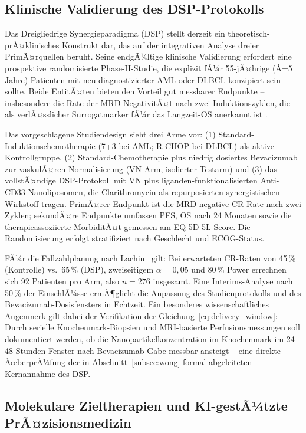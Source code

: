 ﻿\documentclass[12pt,a4paper]{article}
\theoremstyle{definition}
\begin{document}
\subsection{Klinische Validierung des DSP-Protokolls}

Das Dreigliedrige Synergieparadigma (DSP) stellt derzeit ein theoretisch-prÃ¤klinisches
Konstrukt dar, das auf der integrativen Analyse dreier PrimÃ¤rquellen beruht.
Seine endgÃ¼ltige klinische Validierung erfordert eine prospektive randomisierte
Phase-II-Studie, die explizit fÃ¼r 55-jÃ¤hrige (Â±5 Jahre) Patienten mit neu
diagnostizierter AML oder DLBCL konzipiert sein sollte. Beide EntitÃ¤ten bieten
den Vorteil gut messbarer Endpunkte -- insbesondere die Rate der MRD-NegativitÃ¤t
nach zwei Induktionszyklen, die als verlÃ¤sslicher Surrogatmarker fÃ¼r das
Langzeit-OS anerkannt ist \cite{dohner2017}.

Das vorgeschlagene Studiendesign sieht drei Arme vor: (1) Standard-Induktionschemothera\-pie
(7+3 bei AML; R-CHOP bei DLBCL) als aktive Kontrollgruppe, (2) Standard-Chemotherapie
plus niedrig dosiertes Bevacizumab zur vaskulÃ¤ren Normalisierung (VN-Arm, isolierter
Testarm) und (3) das vollstÃ¤ndige DSP-Protokoll mit VN plus liganden-funktionalisierten
Anti-CD33-Nanoliposomen, die Clarithromycin als repurposierten synergistischen Wirkstoff
tragen. PrimÃ¤rer Endpunkt ist die MRD-negative CR-Rate nach zwei Zyklen; sekundÃ¤re
Endpunkte umfassen PFS, OS nach 24 Monaten sowie die therapieassoziierte MorbiditÃ¤t
gemessen am EQ-5D-5L-Score. Die Randomisierung erfolgt stratifiziert nach Geschlecht
und ECOG-Status.

FÃ¼r die Fallzahlplanung nach Lachin~\cite{lachin1981} gilt: Bei erwarteten CR-Raten von
45\,\% (Kontrolle) vs.~65\,\% (DSP), zweiseitigem $\alpha=0{,}05$ und 80\,\% Power
errechnen sich 92 Patienten pro Arm, also $n=276$ insgesamt. Eine Interims-Analyse
nach 50\,\% der EinschlÃ¼sse ermÃ¶glicht die Anpassung des Studienprotokolls und des
Bevacizumab-Dosisfensters in Echtzeit. Ein besonderes wissenschaftliches Augenmerk
gilt dabei der Verifikation der Gleichung~\eqref{eq:delivery_window}: Durch serielle
Knochenmark-Biopsien und MRI-basierte Perfusionsmessungen soll dokumentiert werden,
ob die Nanopartikelkonzentration im Knochenmark im 24--48-Stunden-Fenster nach
Bevacizumab-Gabe messbar ansteigt -- eine direkte ÃœberprÃ¼fung der in Abschnitt~\ref{subsec:wong}
formal abgeleiteten Kernannahme des DSP.

\subsection{Molekulare Zieltherapien und KI-gestÃ¼tzte PrÃ¤zisionsmedizin}
\end{document}
